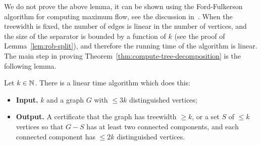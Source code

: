 We do not prove the above lemma, it can be shown using the Ford-Fulkerson algorithm for computing maximum flow, see the discussion in~\cite[p.~198]{Cygan:2015wu}. When the treewidth is fixed, the number of edges is linear in the number of vertices, and the size of the separator is bounded by a function of $k$ (see the proof of Lemma~\ref{lem:rob-split}), and therefore the running time of the algorithm is linear.
The main step in proving Theorem~\ref{thm:compute-tree-decomposition} is the following lemma. 


\begin{lemma}\label{lem:rob-split}
Let $k \in \mathbb{N}$. There is a linear time algorithm which does this:
	\begin{itemize}
	\item {\bf Input.} $k$ and a graph $G$ with  $\le 3k$ distinguished vertices;
\item {\bf Output.}  A certificate that the graph has treewidth $\ge k$, or a set $S$ of  $ \le k$ vertices so that $G-S$ has at least two connected components, and  each connected component has  $\le 2k$ distinguished vertices.
\end{itemize}
\end{lemma}
